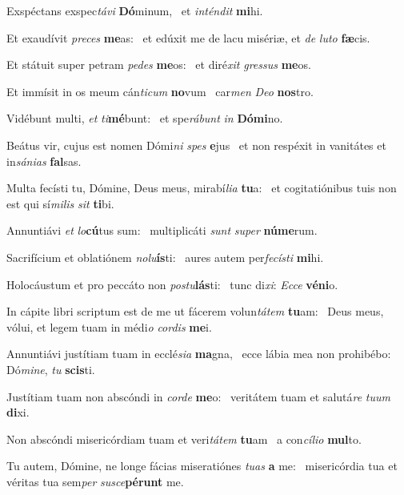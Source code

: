\item Exspéctans exspec\textit{távi} \textbf{Dó}minum,~\psstar{} et \textit{inténdit} \textbf{mi}hi.
\item Et exaudívit \textit{preces} \textbf{me}as:~\psstar{} et edúxit me de lacu misériæ, et \textit{de} \textit{luto} \textbf{fæ}cis.
\item Et státuit super petram \textit{pedes} \textbf{me}os:~\psstar{} et diré\textit{xit} \textit{gressus} \textbf{me}os.
\item Et immísit in os meum cán\textit{ticum} \textbf{no}vum~\psstar{} car\textit{men} \textit{Deo} \textbf{nos}tro.
\item Vidébunt multi, \textit{et} \textit{ti}\textbf{mé}bunt:~\psstar{} et spe\textit{rábunt} \textit{in} \textbf{Dó}\textbf{mi}no.
\item Beátus vir, cujus est nomen Dómi\textit{ni} \textit{spes} \textbf{e}jus~\psstar{} et non respéxit in vanitátes et in\textit{sánias} \textbf{fal}sas.
\item Multa fecísti tu, Dómine, Deus meus, mirabí\textit{lia} \textbf{tu}a:~\psstar{} et cogitatiónibus tuis non est qui sí\textit{milis} \textit{sit} \textbf{ti}bi.
\item Annuntiávi \textit{et} \textit{lo}\textbf{cú}tus sum:~\psstar{} multiplicáti \textit{sunt} \textit{super} \textbf{nú}\textbf{me}rum.
\item Sacrifícium et oblatiónem \textit{nolu}\textbf{ís}ti:~\psstar{} aures autem per\textit{fecísti} \textbf{mi}hi.
\item Holocáustum et pro peccáto non \textit{postu}\textbf{lás}ti:~\psstar{} tunc di\textit{xi}: \textit{Ecce} \textbf{vé}\textbf{ni}o.
\item In cápite libri scriptum est de me ut fácerem volun\textit{tátem} \textbf{tu}am:~\psstar{} Deus meus, vólui, et legem tuam in médi\textit{o} \textit{cordis} \textbf{me}i.
\item Annuntiávi justítiam tuam in ecclé\textit{sia} \textbf{ma}gna,~\psstar{} ecce lábia mea non prohibébo: Dó\textit{mine}, \textit{tu} \textbf{scis}ti.
\item Justítiam tuam non abscóndi in \textit{corde} \textbf{me}o:~\psstar{} veritátem tuam et salutá\textit{re} \textit{tuum} \textbf{di}xi.
\item Non abscóndi misericórdiam tuam et veri\textit{tátem} \textbf{tu}am~\psstar{} a con\textit{cílio} \textbf{mul}to.
\item Tu autem, Dómine, ne longe fácias miseratiónes \textit{tuas} \textbf{a} me:~\psstar{} misericórdia tua et véritas tua sem\textit{per} \textit{susce}\textbf{pé}\textbf{runt} me.
